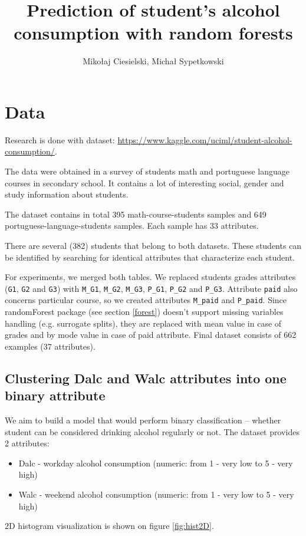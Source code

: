 \documentclass[a4paper]{article}
\begin{document}
\title{Prediction of student's alcohol consumption with random forests}

\author{Mikołaj Ciesielski, Michał Sypetkowski}
\setlength\columnsep{0.375in}  \newlength\titlebox \setlength\titlebox{2.25in}
\twocolumn
\maketitle



\section{Data}

Research is done with dataset: \url{https://www.kaggle.com/uciml/student-alcohol-consumption/}.

The data were obtained in a survey of students
math and portuguese language courses in secondary school.
It contains a lot of interesting social,
gender and study information about students.

The dataset contains in total 395 math-course-students samples and 
649 portuguese-language-students samples. Each sample has 33 attributes.

There are several (382) students that belong to both datasets.
These students can be identified by searching for identical attributes
that characterize each student.

For experiments, we merged both tables.
We replaced students grades attributes
(\texttt{G1}, \texttt{G2} and \texttt{G3})
with
\texttt{M\_G1},
\texttt{M\_G2},
\texttt{M\_G3},
\texttt{P\_G1},
\texttt{P\_G2} and
\texttt{P\_G3}.
Attribute \texttt{paid} also concerns particular course, so we created attributes
\texttt{M\_paid} and \texttt{P\_paid}.
Since randomForest package (see section \ref{forest}) doesn't support missing variables handling (e.g. surrogate splits),
they are replaced with mean value in case of grades and by mode value in case of paid attribute.
Final dataset consists of 662 examples (37 attributes).

\subsection{Clustering Dalc and Walc attributes into one binary attribute}
\label{clust}

We aim to build a model that would perform binary classification --
whether student can be considered drinking alcohol regularly or not.
The dataset provides 2 attributes:
\begin{itemize}
    \item Dalc - workday alcohol consumption (numeric: from 1 - very low to 5 - very high)
    \item Walc - weekend alcohol consumption (numeric: from 1 - very low to 5 - very high)
\end{itemize}
2D histogram visualization is shown on figure \ref{fig:hist2D}.
\end{document}
